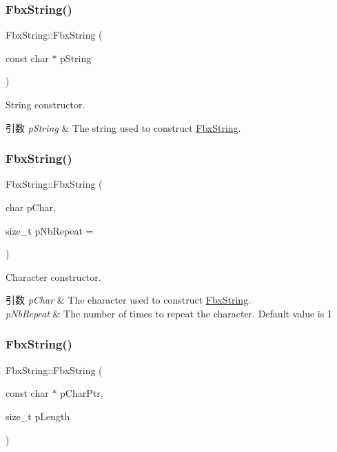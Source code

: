 \subsubsection{\texorpdfstring{Fbx\+String()}{FbxString()}\hspace{0.1cm}{\footnotesize\ttfamily [3/8]}}
{\footnotesize\ttfamily Fbx\+String\+::\+Fbx\+String (\begin{DoxyParamCaption}\item[{const char $\ast$}]{p\+String }\end{DoxyParamCaption})}

String constructor. 
\begin{DoxyParams}{引数}
{\em p\+String} & The string used to construct \hyperlink{class_fbx_string}{Fbx\+String}. \\
\hline
\end{DoxyParams}
\mbox{\label{class_fbx_string_a84c809ef712c772fedff9a295378893e}} 
\subsubsection{\texorpdfstring{Fbx\+String()}{FbxString()}\hspace{0.1cm}{\footnotesize\ttfamily [4/8]}}
{\footnotesize\ttfamily Fbx\+String\+::\+Fbx\+String (\begin{DoxyParamCaption}\item[{char}]{p\+Char,  }\item[{size\+\_\+t}]{p\+Nb\+Repeat = {} }\end{DoxyParamCaption})}

Character constructor. 
\begin{DoxyParams}{引数}
{\em p\+Char} & The character used to construct \hyperlink{class_fbx_string}{Fbx\+String}. \\
\hline
{\em p\+Nb\+Repeat} & The number of times to repeat the character. Default value is 1 \\
\hline
\end{DoxyParams}
\mbox{\label{class_fbx_string_a2aa49fbace620d2bb3ac76e01e02673d}} 
\subsubsection{\texorpdfstring{Fbx\+String()}{FbxString()}\hspace{0.1cm}{\footnotesize\ttfamily [5/8]}}
{\footnotesize\ttfamily Fbx\+String\+::\+Fbx\+String (\begin{DoxyParamCaption}\item[{const char $\ast$}]{p\+Char\+Ptr,  }\item[{size\+\_\+t}]{p\+Length }\end{DoxyParamCaption})}

